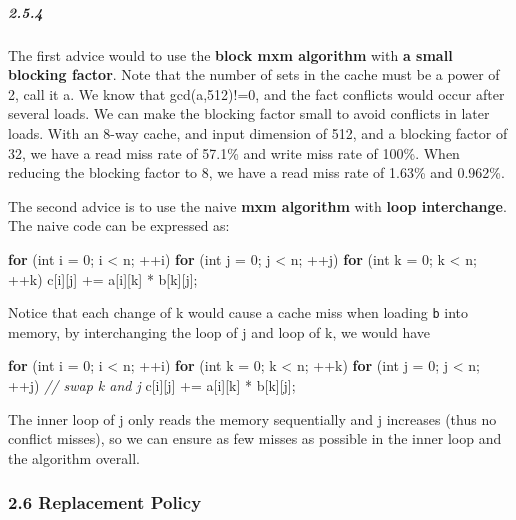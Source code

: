 \documentclass[11pt]{article}
\newenvironment{Shaded}{}{}
\newcommand{\DataTypeTok}[1]{\textcolor[rgb]{0.56,0.13,0.00}{{#1}}}
\newcommand{\DecValTok}[1]{\textcolor[rgb]{0.25,0.63,0.44}{{#1}}}
\newcommand{\CommentTok}[1]{\textcolor[rgb]{0.38,0.63,0.69}{\textit{{#1}}}}
\newcommand{\NormalTok}[1]{{#1}}
\newcommand{\ControlFlowTok}[1]{\textcolor[rgb]{0.00,0.44,0.13}{\textbf{{#1}}}}
\begin{document}
\subparagraph{2.5.4}\label{section-2}

The first advice would to use the \textbf{block mxm algorithm} with
\textbf{a small blocking factor}. Note that the number of sets in the
cache must be a power of 2, call it a. We know that gcd(a,512)!=0, and
the fact conflicts would occur after several loads. We can make the
blocking factor small to avoid conflicts in later loads. With an 8-way
cache, and input dimension of 512, and a blocking factor of 32, we have
a read miss rate of 57.1\% and write miss rate of 100\%. When reducing
the blocking factor to 8, we have a read miss rate of 1.63\% and
0.962\%.

The second advice is to use the naive \textbf{mxm algorithm} with
\textbf{loop interchange}. The naive code can be expressed as:

\begin{Shaded}
\begin{Highlighting}[]
 \ControlFlowTok{for}\NormalTok{ (}\DataTypeTok{int}\NormalTok{ i = }\DecValTok{0}\NormalTok{; i < n; ++i)}
  \ControlFlowTok{for}\NormalTok{ (}\DataTypeTok{int}\NormalTok{ j = }\DecValTok{0}\NormalTok{; j < n; ++j)}
    \ControlFlowTok{for}\NormalTok{ (}\DataTypeTok{int}\NormalTok{ k = }\DecValTok{0}\NormalTok{; k < n; ++k)}
\NormalTok{      c[i][j] += a[i][k] * b[k][j];}
\end{Highlighting}
\end{Shaded}

Notice that each change of k would cause a cache miss when loading
\texttt{b} into memory, by interchanging the loop of j and loop of k, we
would have

\begin{Shaded}
\begin{Highlighting}[]
 \ControlFlowTok{for}\NormalTok{ (}\DataTypeTok{int}\NormalTok{ i = }\DecValTok{0}\NormalTok{; i < n; ++i)}
  \ControlFlowTok{for}\NormalTok{ (}\DataTypeTok{int}\NormalTok{ k = }\DecValTok{0}\NormalTok{; k < n; ++k)}
    \ControlFlowTok{for}\NormalTok{ (}\DataTypeTok{int}\NormalTok{ j = }\DecValTok{0}\NormalTok{; j < n; ++j) }\CommentTok{// swap k and j}
\NormalTok{      c[i][j] += a[i][k] * b[k][j];}
\end{Highlighting}
\end{Shaded}

The inner loop of j only reads the memory sequentially and j increases
(thus no conflict misses), so we can ensure as few misses as possible in
the inner loop and the algorithm overall.

    \subsubsection{2.6 Replacement Policy}\label{replacement-policy}
\end{document}
